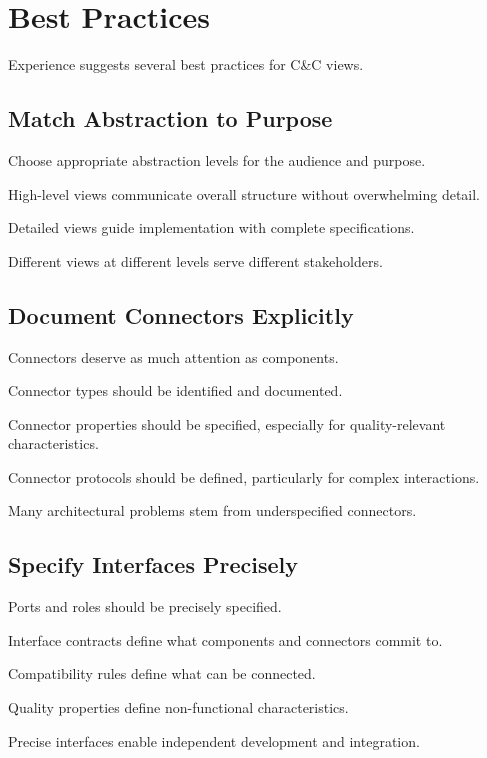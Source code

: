 \documentclass[11pt]{article}
\begin{document}
\section{Best Practices}

Experience suggests several best practices for C\&C views.

\subsection{Match Abstraction to Purpose}

Choose appropriate abstraction levels for the audience and purpose.

High-level views communicate overall structure without overwhelming detail.

Detailed views guide implementation with complete specifications.

Different views at different levels serve different stakeholders.

\subsection{Document Connectors Explicitly}

Connectors deserve as much attention as components.

Connector types should be identified and documented.

Connector properties should be specified, especially for quality-relevant characteristics.

Connector protocols should be defined, particularly for complex interactions.

Many architectural problems stem from underspecified connectors.

\subsection{Specify Interfaces Precisely}

Ports and roles should be precisely specified.

Interface contracts define what components and connectors commit to.

Compatibility rules define what can be connected.

Quality properties define non-functional characteristics.

Precise interfaces enable independent development and integration.
\end{document}
